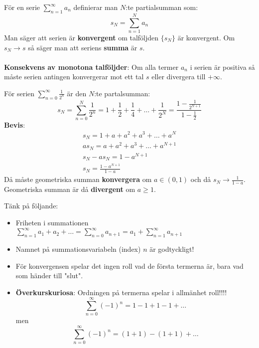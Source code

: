 \documentclass{report}
\begin{document}
För en serie $ \sum_{n = 1}^{ \infty} a_n $ definierar man $ N $:te partialsumman som:
\begin{equation*}
s_N = \sum_{n = 1}^{N} a_n 
\end{equation*}
Man säger att serien är \textbf{konvergent} om talföljden $ \{ s_N \} $ är konvergent. Om $ s_N \to s $ så säger man att seriens \textbf{summa} är $ s $.\\\\

\noindent
\textbf{Konsekvens av monotona talföljder}: Om alla termer $ a_n $ i serien är positiva så måste serien antingen konvergerar mot ett tal $ s $ eller divergera till $ + \infty $.

{
För serien $ \sum_{n = 0}^{ \infty  } \frac{1}{2^n}  $ är den $ N $:te partalsumman:
\begin{equation*}
	s_N = \sum_{n = 0}^{N} \frac{1}{2^n}  = 1 + \frac{1}{2} + \frac{1}{4} + \ldots + \frac{1}{2^N} = \frac{1 - \frac{1}{2^{N+1}} }{1 - \frac{1}{2} }  
\end{equation*}
\textbf{Bevis}:
\begin{align*}
s_N = 1 + a + a^2 + a^3 + \ldots + a^N \\
a s_N = a+ a^2 + a^3 + \ldots + a^{N+1} \\
s_N - as_N = 1 - a^{ N+1 } \\
s_N = \frac{1 -a^{N+1}}{ 1 - a } 
\end{align*}
Då måste geometriska summan \textbf{konvergera} om $ a \in (0, 1) $ och då $ s_N \to \frac{1}{1-a}  $. Geometriska summan är då \textbf{divergent} om $ a \ge 1 $.   
}

\noindent
Tänk på följande:
\begin{itemize}
	\item Friheten i summationen $ \sum_{n = 1}^{ \infty} a_1 + a_2 + \ldots  = \sum_{n = 0}^{ \infty} a_{n+1} = a_1 + \sum_{n = 1}^{ \infty} a_{n+1} $
	\item Namnet på summationsvariabeln (index) $ n $ är godtyckligt!
	\item För konvergensen spelar det ingen roll vad de första termerna är, bara vad som händer till "slut".
	\item \textbf{Överkurskuriosa}: Ordningen på termerna spelar i allmänhet roll!!!!
	\begin{equation*}
	\sum_{n = 0}^{ \infty} (-1)^n = 1 - 1 + 1 - 1 + \ldots 
	\end{equation*}
	men
	\begin{equation*}
	\sum_{n = 0}^{ \infty } (-1)^n = (1+1)-(1+1)+ \ldots 
	\end{equation*}
\end{itemize}
\end{document}
